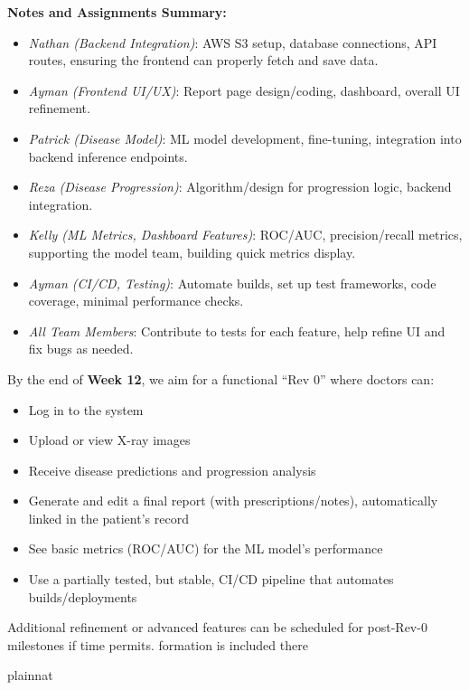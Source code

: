 \documentclass[12pt, titlepage]{article}
\begin{document}
\noindent \textbf{Notes and Assignments Summary:} \begin{itemize} \item \textit{Nathan (Backend Integration)}: AWS S3 setup, database connections, API routes, ensuring the frontend can properly fetch and save data.
\item \textit{Ayman (Frontend UI/UX)}: Report page design/coding, dashboard, overall UI refinement.
\item \textit{Patrick (Disease Model)}: ML model development, fine-tuning, integration into backend inference endpoints.
\item \textit{Reza (Disease Progression)}: Algorithm/design for progression logic, backend integration.
\item \textit{Kelly (ML Metrics, Dashboard Features)}: ROC/AUC, precision/recall metrics, supporting the model team, building quick metrics display.
\item \textit{Ayman (CI/CD, Testing)}: Automate builds, set up test frameworks, code coverage, minimal performance checks.
\item \textit{All Team Members}: Contribute to tests for each feature, help refine UI and fix bugs as needed. \end{itemize}

\noindent By the end of \textbf{Week 12}, we aim for a functional “Rev 0” where doctors can: \begin{itemize} \item Log in to the system
\item Upload or view X-ray images
\item Receive disease predictions and progression analysis
\item Generate and edit a final report (with prescriptions/notes), automatically linked in the patient’s record
\item See basic metrics (ROC/AUC) for the ML model’s performance
\item Use a partially tested, but stable, CI/CD pipeline that automates builds/deployments
\end{itemize}

\noindent Additional refinement or advanced features can be scheduled for post-Rev-0 milestones if time permits.
formation is included there

 {plainnat}


\newpage{}
\end{document}
